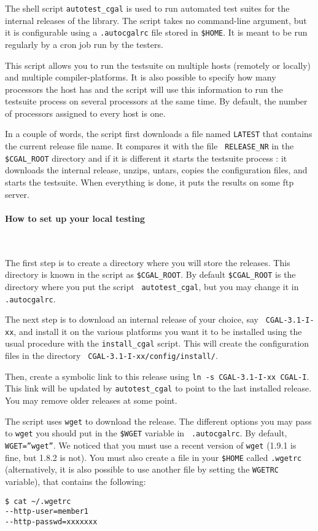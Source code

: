 The shell script {\tt autotest\_cgal} is used to run automated test suites for
the internal releases of the library. The script takes no command-line
argument, but it is configurable using a {\tt .autocgalrc} file stored
in {\tt \$HOME}.
It is meant to be run regularly by a cron job run by the testers.

This script allows you to run the testsuite on multiple hosts (remotely or
locally) and multiple compiler-platforms. It is also possible to specify how
many processors the host has and the script will use this information to run
the testsuite process on several processors at the same time. By default, the
number of processors assigned to every host is one.

In a couple of words, the script first downloads a file named {\tt LATEST}
that contains the current release file name. It compares it with the file {\tt
RELEASE\_NR} in the {\tt \$CGAL\_ROOT} directory and if it is different it
starts the testsuite process : it downloads the internal release, unzips,
untars, copies the configuration files, and starts the testsuite. When
everything is done, it puts the results on some ftp server.

\paragraph{How to set up your local testing} ~

The first step is to create a directory where you will store the releases. 
This directory is known in the script as {\tt \$CGAL\_ROOT}. By default
{\tt \$CGAL\_ROOT} is the directory where you put the script {\tt
autotest\_cgal}, but you may change it in {\tt .autocgalrc}. 

The next step is to download an internal release of your choice, say {\tt
CGAL-3.1-I-xx}, and install it on the various platforms you want it to be
installed using the usual procedure with the {\tt install\_cgal} script.
This will create the configuration files in the directory {\tt
CGAL-3.1-I-xx/config/install/}.

Then, create a symbolic link to this release using {\tt ln -s CGAL-3.1-I-xx
CGAL-I}. This link will be updated by {\tt autotest\_cgal} to point to the
last installed release.  You may remove older releases at some point.

The script uses {\tt wget} to download the release. The different options you
may pass to {\tt wget} you should put in the {\tt \$WGET} variable in {\tt
.autocgalrc}. By default, {\tt WGET=''wget''}. We noticed that you must use
a recent version of {\tt wget} (1.9.1 is fine, but 1.8.2 is not). You must
also create a file in your {\tt \$HOME} called {\tt .wgetrc} (alternatively,
it is also possible to use another file by setting the {\tt WGETRC} variable),
that contains the following:
\begin{verbatim}
$ cat ~/.wgetrc 
--http-user=member1
--http-passwd=xxxxxxx
\end{verbatim}


